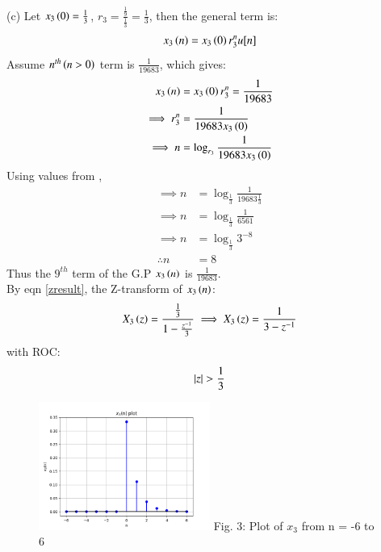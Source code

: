 \documentclass[journal,12pt,twocolumn]{IEEEtran}
\theoremstyle{remark}
\begin{document}
(c) Let $x_3\left(0\right) = \frac{1}{3}$, $r_3 = \frac{\frac{1}{9}}{\frac{1}{3}} = \frac{1}{3}$, then the general term is:
\begin{align}
    x_3\left(n\right) = x_3\left(0\right) r_3^nu[n]
\end{align}
Assume $n^{th}\left(n > 0\right)$ term is $\frac{1}{19683}$, which gives: 
\begin{align}
    x_3\left(n\right) &= x_3\left(0\right) r_3^n = \frac{1}{19683}\\
    \implies r_3^n &= \frac{1}{19683 x_3\left(0\right)}\\
    \implies n &= \log_{r_3}{\frac{1}{19683 x_3\left(0\right)}}
\end{align}
Using values from ,
\begin{align}
    \implies n &= \log_{\frac{1}{3}}{\frac{1}{19683 \frac{1}{3}}}\\
    \implies n &= \log_{\frac{1}{3}}{\frac{1}{6561}}\\
    \implies n &= \log_{\frac{1}{3}}{3^{-8}}\\
    \therefore n &= 8
\end{align}
Thus the $9^{th}$ term of the G.P $x_3\left(n\right)$ is $\frac{1}{19683}$.\\
By eqn \ref{zresult}, the Z-transform of $x_3\left(n\right)$:
\begin{align}
    X_3\left(z\right) = \frac{\frac{1}{3}}{1 - \frac{z^{-1}}{3}}
    \implies X_3\left(z\right) = \frac{1}{3 - z^{-1}}
\end{align} with ROC: \[ \left\vert z\right\vert > \frac{1}{3} \]

\begin{figure}[h!]
    \centering
    \includegraphics[width=0.5\textwidth]{figs/c.png}
    Fig. 3: Plot of $x_3$ from n = -6 to 6
    \label{fig:img3}
\end{figure}


\end{document}
